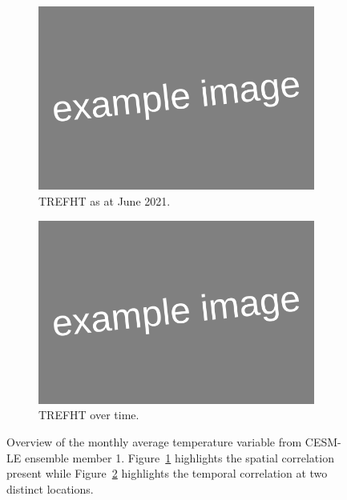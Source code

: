\begin{figure}[htbp!] 
	\centering
	\begin{subfigure}[b]{0.45\textwidth}
		\includegraphics[width=\textwidth]{Example_image}
		\caption{TREFHT as at June 2021.}
		\label{fig:temp_june}   
	\end{subfigure}             
	\begin{subfigure}[b]{0.45\textwidth}
		\includegraphics[width=\textwidth]{Example_image}
		\caption{TREFHT  over time.}
		\label{fig:temp_temp}
	\end{subfigure}             
	\caption[Overview of Temperature variable]{Overview of the monthly average temperature variable from CESM-LE ensemble member 1. Figure~\ref{fig:temp_june} highlights the spatial correlation present while Figure~\ref{fig:temp_temp} highlights the temporal correlation at two distinct locations.}
	\label{fig:temp_overview}
\end{figure}

